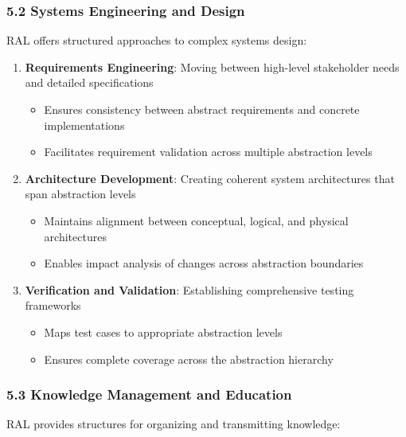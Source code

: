 \documentclass[
]{article}
\providecommand{\tightlist}{%
  \setlength{\itemsep}{0pt}\setlength{\parskip}{0pt}}
\begin{document}
\subsubsection{5.2 Systems Engineering and
Design}\label{systems-engineering-and-design}

RAL offers structured approaches to complex systems design:

\begin{enumerate}
\def\labelenumi{\arabic{enumi}.}
\tightlist
\item
  \textbf{Requirements Engineering}: Moving between high-level
  stakeholder needs and detailed specifications

  \begin{itemize}
  \tightlist
  \item
    Ensures consistency between abstract requirements and concrete
    implementations
  \item
    Facilitates requirement validation across multiple abstraction
    levels
  \end{itemize}
\item
  \textbf{Architecture Development}: Creating coherent system
  architectures that span abstraction levels

  \begin{itemize}
  \tightlist
  \item
    Maintains alignment between conceptual, logical, and physical
    architectures
  \item
    Enables impact analysis of changes across abstraction boundaries
  \end{itemize}
\item
  \textbf{Verification and Validation}: Establishing comprehensive
  testing frameworks

  \begin{itemize}
  \tightlist
  \item
    Maps test cases to appropriate abstraction levels
  \item
    Ensures complete coverage across the abstraction hierarchy
  \end{itemize}
\end{enumerate}

\subsubsection{5.3 Knowledge Management and
Education}\label{knowledge-management-and-education}

RAL provides structures for organizing and transmitting knowledge:
\end{document}
